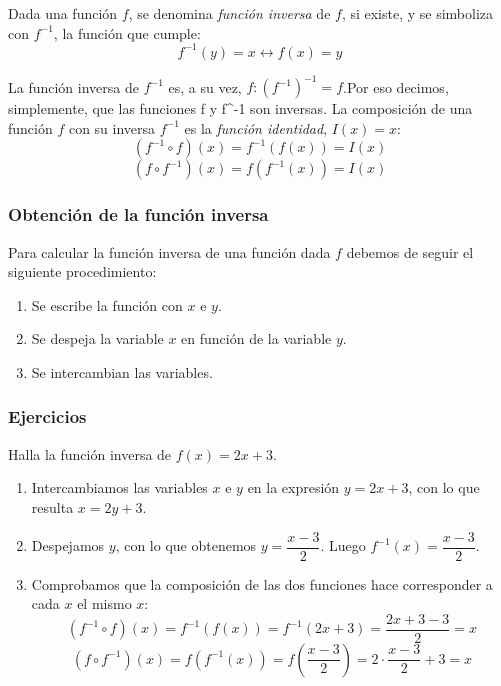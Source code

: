 
\begin{definition}
Dada una función $f$, se denomina \emph{función inversa} de $f$, si existe, y se simboliza con $f^{-1}$, la función que cumple:
$$f^{-1}(y) = x \longleftrightarrow f(x) = y$$
\end{definition}
La función inversa de $f^{-1}$ es, a su vez, $f: (f^{-1})^{-1}=f$.Por eso decimos, simplemente, que las funciones f y f^{-1} son inversas.
La composición de una función $f$ con su inversa $f^{-1}$ es la \emph{función identidad}, $I(x)=x$:
$$(f^{-1} \circ f)(x) = f^{-1}(f(x)) = I(x)$$
$$(f \circ f^{-1})(x) =f(f^{-1}(x))=I(x)$$

\subsubsection{Obtención de la función inversa}
Para calcular la función inversa de una función dada $f$ debemos de seguir el siguiente procedimiento:
\begin{enumerate}
	\item Se escribe la función con $x$ e $y$.
	\item Se despeja la variable $x$ en función de la variable $y$.
	\item Se intercambian las variables.
\end{enumerate}

\subsubsection{Ejercicios}
\begin{ex}
	Halla la función inversa de $f(x)=2x+3$.
	\begin{sol}
		\begin{enumerate}
			\item Intercambiamos las variables $x$ e $y$ en la expresión $y=2x+3$, con lo que resulta $x=2y+3$.
			\item Despejamos $y$, con lo que obtenemos $y=\dfrac{x-3}{2}$. Luego $f^{-1}(x)=\dfrac{x-3}{2}$.
			\item Comprobamos que la composición de las dos funciones hace corresponder a cada $x$ el mismo $x$:
			$$(f^{-1} \circ f)(x) = f^{-1}(f(x)) = f^{-1}(2x+3) = \dfrac{2x + 3 - 3}{2} = x$$
			$$(f \circ f^{-1})(x) = f(f^{-1}(x)) = f(\dfrac{x-3}{2}) =2 \cdot \dfrac{x-3}{2} + 3 = x$$
		\end{enumerate}
	\end{sol}
\end{ex}

